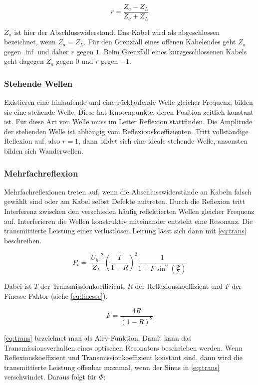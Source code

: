 \begin{equation}
	r = \frac{Z_a - Z_L}{Z_a + Z_L}
	\label{eq:reflexion}
\end{equation}

$Z_a$ ist hier der Abschlusswiderstand. Das Kabel wird als abgeschlossen bezeichnet, wenn  $Z_a = Z_L$. Für den Grenzfall eines offenen Kabelendes geht $Z_a$ gegen $\inf$ und daher $r$ gegen $1$. Beim Grenzfall eines kurzgeschlossenen Kabels geht dagegen $Z_a$ gegen $0$ und $r$ gegen $-1$.

\subsubsection{Stehende Wellen}
Existieren eine hinlaufende und eine rücklaufende Welle gleicher Frequenz, bilden sie eine stehende Welle. Diese hat Knotenpunkte, deren Position zeitlich konstant ist. Für diese Art von Welle muss im Leiter Reflexion stattfinden. Die Amplitude der stehenden Welle ist abhängig vom Reflexionskoeffizienten. Tritt vollständige Reflexion auf, also $r=1$, dann bildet sich eine ideale stehende Welle, ansonsten bilden sich Wanderwellen.

\subsubsection{Mehrfachreflexion}
Mehrfachreflexionen treten auf, wenn die Abschlusswiderstände an Kabeln falsch gewählt sind oder am Kabel selbst Defekte auftreten. Durch die Reflexion tritt Interferenz zwischen den verschieden häufig reflektierten Wellen gleicher Frequenz auf. Interferieren die Wellen konstruktiv miteinander entsteht eine Resonanz. Die transmittierte Leistung einer verlustlosen Leitung lässt sich dann mit \cref{eq:trans} beschreiben.

\begin{equation}
	P_t = \frac{|U_h|^2}{Z_L}\left( \frac{T}{1-R}\right) ^2 \frac{1}{1 + F \sin^2\left( \frac{\Phi}{2}\right) }
	\label{eq:trans}
\end{equation}

Dabei ist $T$ der Transmissionkoeffizient, $R$ der Reflexionskoeffizient und $F$ der Finesse Faktor (siehe \cref{eq:finesse}).

\begin{equation}
	F = \frac{4R}{\left( 1-R\right) ^2}
	\label{eq:finesse}
\end{equation}

\cref{eq:trans} bezeichnet man als Airy-Funktion. Damit kann das Transmissionsverhalten eines optischen Resonators beschrieben werden. Wenn Reflexionskoeffizient und Transmissionkoeffizient konstant sind, dann wird die transmittierte Leistung offenbar maximal, wenn der Sinus in \cref{eq:trans} verschwindet. Daraus folgt für $\Phi$:

